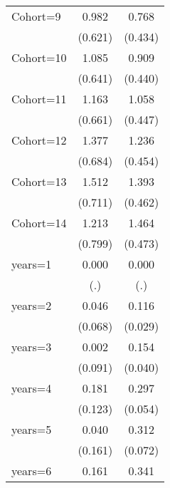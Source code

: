 \begin{table}[htbp]
\begin{tabular}{l*{2}{c}}
\addlinespace
Cohort=9            &       0.982         &       0.768\sym{*}  \\
                    &     (0.621)         &     (0.434)         \\
\addlinespace
Cohort=10           &       1.085\sym{*}  &       0.909\sym{**} \\
                    &     (0.641)         &     (0.440)         \\
\addlinespace
Cohort=11           &       1.163\sym{*}  &       1.058\sym{**} \\
                    &     (0.661)         &     (0.447)         \\
\addlinespace
Cohort=12           &       1.377\sym{**} &       1.236\sym{***}\\
                    &     (0.684)         &     (0.454)         \\
\addlinespace
Cohort=13           &       1.512\sym{**} &       1.393\sym{***}\\
                    &     (0.711)         &     (0.462)         \\
\addlinespace
Cohort=14           &       1.213         &       1.464\sym{***}\\
                    &     (0.799)         &     (0.473)         \\
\addlinespace
years=1             &       0.000         &       0.000         \\
                    &         (.)         &         (.)         \\
\addlinespace
years=2             &       0.046         &       0.116\sym{***}\\
                    &     (0.068)         &     (0.029)         \\
\addlinespace
years=3             &       0.002         &       0.154\sym{***}\\
                    &     (0.091)         &     (0.040)         \\
\addlinespace
years=4             &       0.181         &       0.297\sym{***}\\
                    &     (0.123)         &     (0.054)         \\
\addlinespace
years=5             &       0.040         &       0.312\sym{***}\\
                    &     (0.161)         &     (0.072)         \\
\addlinespace
years=6             &       0.161         &       0.341\sym{***}\\

\end{tabular}
\end{table}
